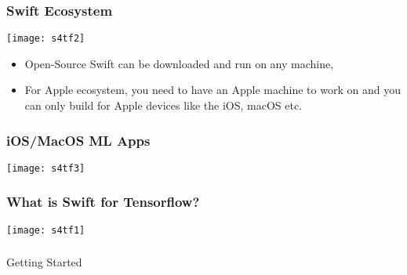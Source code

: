 \begin{frame} \frametitle{Swift Ecosystem}
\begin{center}
\texttt{[image: s4tf2]}
\end{center}

\begin{itemize}
\item Open-Source Swift can be downloaded and run on any machine,
\item For Apple ecosystem, you need to have an Apple machine to work on and you can only build for Apple devices like the iOS, macOS etc.
\end{itemize}

\end{frame}

\begin{frame} \frametitle{iOS/MacOS ML Apps}
\begin{center}
\texttt{[image: s4tf3]}
\end{center}
\end{frame}



\begin{frame} \frametitle{What is Swift for Tensorflow?}
\begin{center}
\texttt{[image: s4tf1]}
\end{center}
\end{frame}


\begin{frame}[fragile]\frametitle{}
\begin{center}
{\Large Getting Started}
\end{center}
\end{frame}

